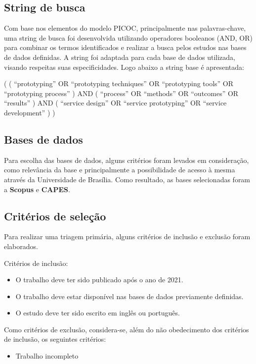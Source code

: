 \subsection{String de busca}

Com base nos elementos do modelo PICOC, principalmente nas palavras-chave, uma string de busca foi desenvolvida utilizando operadores booleanos (AND, OR) para combinar os termos identificados e realizar a busca pelos estudos nas bases de dados definidas. A string foi adaptada para cada base de dados utilizada, visando respeitas suas especificidades. Logo abaixo a string base é apresentada:


( ( ``prototyping'' OR ``prototyping techniques'' OR ``prototyping tools'' OR ``prototyping process'' ) AND ( ``process'' OR ``methods'' OR ``outcomes'' OR ``results'' ) AND ( ``service design'' OR ``service prototyping'' OR ``service development'' ) )


\subsection{Bases de dados}

Para escolha das bases de dados, alguns critérios foram levados em consideração, como relevância da base e principalmente a possibilidade de acesso à mesma através da Universidade de Brasília. Como resultado, as bases selecionadas foram a \textbf{Scopus} e \textbf{CAPES}.

\subsection{Critérios de seleção}

Para realizar uma triagem primária, alguns critérios de inclusão e exclusão foram elaborados.

Critérios de inclusão:
\begin{itemize}
	\item O trabalho deve ter sido publicado após o ano de 2021.
	
	\item O trabalho deve estar disponível nas bases de dados previamente definidas.
	
	\item O estudo deve ter sido escrito em inglês ou português.
	
\end{itemize}

Como critérios de exclusão, considera-se, além do não obedecimento dos critérios de inclusão, os seguintes critérios:
\begin{itemize}
	\item Trabalho incompleto
\end{itemize}

